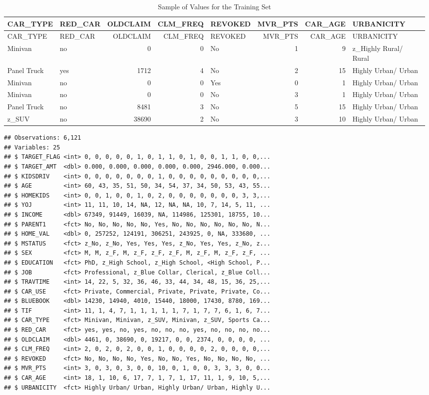 \documentclass[]{article}
\begin{document}
\begin{longtable}[]{@{}llrrlrrl@{}}
\caption{Sample of Values for the Training Set}\tabularnewline
\toprule
CAR\_TYPE & RED\_CAR & OLDCLAIM & CLM\_FREQ & REVOKED & MVR\_PTS &
CAR\_AGE & URBANICITY\tabularnewline
\midrule
\endfirsthead
\toprule
CAR\_TYPE & RED\_CAR & OLDCLAIM & CLM\_FREQ & REVOKED & MVR\_PTS &
CAR\_AGE & URBANICITY\tabularnewline
\midrule
\endhead
Minivan & no & 0 & 0 & No & 1 & 9 & z\_Highly Rural/
Rural\tabularnewline
Panel Truck & yes & 1712 & 4 & No & 2 & 15 & Highly Urban/
Urban\tabularnewline
Minivan & no & 0 & 0 & Yes & 0 & 1 & Highly Urban/ Urban\tabularnewline
Minivan & no & 0 & 0 & No & 3 & 1 & Highly Urban/ Urban\tabularnewline
Panel Truck & no & 8481 & 3 & No & 5 & 15 & Highly Urban/
Urban\tabularnewline
z\_SUV & no & 38690 & 2 & No & 3 & 10 & Highly Urban/
Urban\tabularnewline
\bottomrule
\end{longtable}

\begin{verbatim}
## Observations: 6,121
## Variables: 25
## $ TARGET_FLAG <int> 0, 0, 0, 0, 0, 1, 0, 1, 1, 0, 1, 0, 0, 1, 1, 0, 0,...
## $ TARGET_AMT  <dbl> 0.000, 0.000, 0.000, 0.000, 0.000, 2946.000, 0.000...
## $ KIDSDRIV    <int> 0, 0, 0, 0, 0, 0, 0, 1, 0, 0, 0, 0, 0, 0, 0, 0, 0,...
## $ AGE         <int> 60, 43, 35, 51, 50, 34, 54, 37, 34, 50, 53, 43, 55...
## $ HOMEKIDS    <int> 0, 0, 1, 0, 0, 1, 0, 2, 0, 0, 0, 0, 0, 0, 0, 3, 3,...
## $ YOJ         <int> 11, 11, 10, 14, NA, 12, NA, NA, 10, 7, 14, 5, 11, ...
## $ INCOME      <dbl> 67349, 91449, 16039, NA, 114986, 125301, 18755, 10...
## $ PARENT1     <fct> No, No, No, No, No, Yes, No, No, No, No, No, No, N...
## $ HOME_VAL    <dbl> 0, 257252, 124191, 306251, 243925, 0, NA, 333680, ...
## $ MSTATUS     <fct> z_No, z_No, Yes, Yes, Yes, z_No, Yes, Yes, z_No, z...
## $ SEX         <fct> M, M, z_F, M, z_F, z_F, z_F, M, z_F, M, z_F, z_F, ...
## $ EDUCATION   <fct> PhD, z_High School, z_High School, <High School, P...
## $ JOB         <fct> Professional, z_Blue Collar, Clerical, z_Blue Coll...
## $ TRAVTIME    <int> 14, 22, 5, 32, 36, 46, 33, 44, 34, 48, 15, 36, 25,...
## $ CAR_USE     <fct> Private, Commercial, Private, Private, Private, Co...
## $ BLUEBOOK    <dbl> 14230, 14940, 4010, 15440, 18000, 17430, 8780, 169...
## $ TIF         <int> 11, 1, 4, 7, 1, 1, 1, 1, 1, 7, 1, 7, 7, 6, 1, 6, 7...
## $ CAR_TYPE    <fct> Minivan, Minivan, z_SUV, Minivan, z_SUV, Sports Ca...
## $ RED_CAR     <fct> yes, yes, no, yes, no, no, no, yes, no, no, no, no...
## $ OLDCLAIM    <dbl> 4461, 0, 38690, 0, 19217, 0, 0, 2374, 0, 0, 0, 0, ...
## $ CLM_FREQ    <int> 2, 0, 2, 0, 2, 0, 0, 1, 0, 0, 0, 0, 2, 0, 0, 0, 0,...
## $ REVOKED     <fct> No, No, No, No, Yes, No, No, Yes, No, No, No, No, ...
## $ MVR_PTS     <int> 3, 0, 3, 0, 3, 0, 0, 10, 0, 1, 0, 0, 3, 3, 3, 0, 0...
## $ CAR_AGE     <int> 18, 1, 10, 6, 17, 7, 1, 7, 1, 17, 11, 1, 9, 10, 5,...
## $ URBANICITY  <fct> Highly Urban/ Urban, Highly Urban/ Urban, Highly U...
\end{verbatim}
\end{document}
